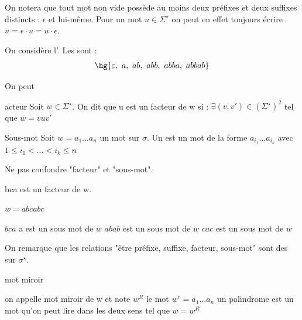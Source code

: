 \documentclass[a4paper,french,bookmarks]{book}
\begin{document}
    On notera que tout mot non vide possède au moins deux préfixes et deux suffixes distincts : $\epsilon$ et lui-même. Pour un mot $u \in \Sigma^\star$ on peut en effet toujours écrire $u = \epsilon\cdot u = u \cdot \epsilon$.
    
    \begin{example}{}{}
        On considère l'. Les  sont :
        \[ \hg{\epsilon,\ a,\ ab,\ abb,\ abba,\ abbab} \]
    \end{example}
    
    On peut 
    
    \begin{definition}{acteur}{}
        Soit $w \in \Sigma^\star$.
        On dit que u est un facteur de w si :
        $\exists (v,v') \in (\Sigma^\star)^2$ tel que $w = v u v'$
        
    \end{definition}
    
    \begin{definition}{Sous-mot}{}
        Soit $w=a_1 \dots a_n$ un mot sur $\sigma$.
        Un  est un mot de la forme $a_{i_1} \dots a_{i_k}$ avec $1 \leq i_1 < \dots < i_k \leq n$
        
    \end{definition}
    
    \begin{warning}{}{}
        Ne pas confondre "facteur" et "sous-mot".
        \begin{enumerate}
            \itt bca est un facteur de w.
        \end{enumerate}
    \end{warning}
    
    \begin{example}{}{}
        $w=abcabc$
        \begin{enumerate}
            \itt $bca$ a est un sous mot de $w$
            \itt $abab$ est un sous mot de $w$
            \itt $cac$ est un sous mot de $w$
            
            
        \end{enumerate}
        
        On remarque que les relations "être préfixe, suffixe, facteur, sous-mot" sont des  sur $\sigma^\star$.
        
    \end{example}
    \begin{definition}{mot miroir}{}
        \begin{enumerate}
            \itt on appelle mot miroir de w et note $w^R$
        le mot $w^r =  a_1 \dots a_n$
            \itt un palindrome est un mot qu'on peut lire dans les deux sens tel que $w=w^R$
            
            
            
        \end{enumerate}
        
    \end{definition}
    
\end{document}
